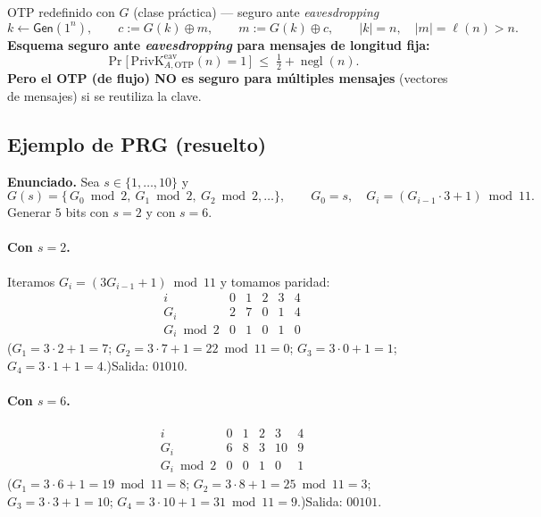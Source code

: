 \documentclass[11pt,a4paper]{article}
\newcommand{\xor}{\oplus}
\newcommand{\Gen}{\mathsf{Gen}}
\DeclareMathOperator{\negl}{negl}
\begin{document}
\begin{practbox}{OTP redefinido con $G$ (clase práctica) — seguro ante \emph{eavesdropping}}
\[
  k\leftarrow\Gen(1^n),\qquad c:=G(k)\xor m,\qquad m:=G(k)\xor c,
  \qquad |k|=n,\quad |m|=\ell(n)>n.
\]
\textbf{Esquema seguro ante \emph{eavesdropping} para mensajes de longitud fija:}
\[
  \Pr\!\big[\,\mathrm{PrivK}^{\mathrm{eav}}_{A,\mathrm{OTP}}(n)=1\,\big]\;\le\;\tfrac12+\negl(n).
\]
\textcolor{attackRed}{\textbf{Pero el OTP (de flujo) NO es seguro para múltiples
mensajes}} (vectores de mensajes) si se reutiliza la clave.
\end{practbox}

\subsection{Ejemplo de PRG (resuelto)}

\begin{slidebox}
\textbf{Enunciado.} Sea $s\in\{1,\dots,10\}$ y
\[
  G(s) = \{\,G_0\bmod 2,\ G_1\bmod 2,\ G_2\bmod 2,\dots\},\qquad
  G_0 = s,\quad G_i = (G_{i-1}\cdot 3 + 1)\bmod 11.
\]
Generar $5$ bits con $s=2$ y con $s=6$.
\end{slidebox}

\paragraph{Con $s=2$.} Iteramos $G_i=(3G_{i-1}+1)\bmod 11$ y tomamos paridad:
\[
\begin{array}{c|ccccc}
  i & 0 & 1 & 2 & 3 & 4\\\hline
  G_i & 2 & 7 & 0 & 1 & 4\\
  G_i\bmod 2 & 0 & 1 & 0 & 1 & 0
\end{array}
\]
($G_1=3\cdot2+1=7$; $G_2=3\cdot7+1=22\bmod11=0$; $G_3=3\cdot0+1=1$;
$G_4=3\cdot1+1=4$.)\quad Salida: $\boxed{01010}$.

\paragraph{Con $s=6$.}
\[
\begin{array}{c|ccccc}
  i & 0 & 1 & 2 & 3 & 4\\\hline
  G_i & 6 & 8 & 3 & 10 & 9\\
  G_i\bmod 2 & 0 & 0 & 1 & 0 & 1
\end{array}
\]
($G_1=3\cdot6+1=19\bmod11=8$; $G_2=3\cdot8+1=25\bmod11=3$; $G_3=3\cdot3+1=10$;
$G_4=3\cdot10+1=31\bmod11=9$.)\quad Salida: $\boxed{00101}$.
\end{document}
